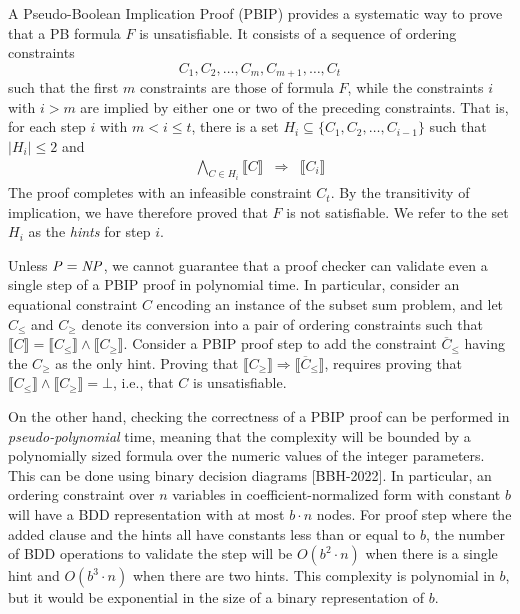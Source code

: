 \documentclass{easychair}
\newcommand{\nil}{\bot}
\renewcommand{\obar}[1]{\overline{#1}}
\newcommand{\imply}{\Rightarrow}
\newcommand{\func}[1]{\llbracket#1\rrbracket}
\begin{document}
A Pseudo-Boolean Implication Proof (PBIP) provides a systematic way to
prove that a PB formula $F$ is unsatisfiable.  It consists of a sequence of ordering constraints
\begin{displaymath}
  C_1, C_2, \ldots, C_m, C_{m+1}, \ldots, C_t
\end{displaymath}  
such that the first $m$ constraints are those of formula $F$, while the constraints $i$
with $i > m$ are implied by either one or two of the preceding constraints.
That is, for each step $i$ with $m < i \leq t$,
there is a set $H_i \subseteq \{C_1, C_2, \ldots, C_{i-1} \}$ such that $|H_i| \leq 2$ and
\begin{eqnarray}
\bigwedge_{C \in H_i} \func{C} & \imply & \func{C_i} \label{eqn:proofsequence}
\end{eqnarray}
The proof completes with an infeasible constraint $C_t$.
By the transitivity of implication, we have therefore proved that $F$ is not satisfiable.
We refer to the set $H_i$ as the {\em hints} for step $i$.

Unless ${\it P} = {\it NP}$, we cannot guarantee that a proof checker
can validate even a single step of a PBIP proof in polynomial time.
In particular, consider an equational constraint $C$ encoding an
instance of the subset sum problem, and let $C_{\leq}$ and $C_{\geq}$
denote its conversion into a pair of ordering constraints such that
$\func{C} = \func{C_{\leq}} \land \func{C_{\geq}}$.  Consider a PBIP
proof step to add the constraint $\obar{C}_{\leq}$ having the 
$C_{\geq}$ as the only hint.  Proving that
$\func{C_{\geq}} \imply \func{\obar{C}_{\leq}}$, requires proving that
$\func{C_{\leq}} \land \func{C_{\geq}} = \nil$, i.e., that $C$ is unsatisfiable.

On the other hand, checking the correctness of a PBIP proof can be
performed in {\em pseudo-polynomial} time, meaning that the complexity will
be bounded by a polynomially sized formula over the numeric values of
the integer parameters.  This can be done using binary decision
diagrams [BBH-2022].  In particular, an ordering constraint over $n$ variables in
coefficient-normalized form with constant $b$ will have a BDD
representation with at most $b \cdot n$ nodes.  For proof step where
the added clause and the hints all have constants less than or equal
to $b$, the number of BDD operations to validate the step will be
$O(b^{2} \cdot n)$ when there is a single hint and $O(b^{3} \cdot n)$
when there are two hints.  This complexity is polynomial in $b$, but
it would be exponential in the size of a binary representation of $b$.
\end{document}
